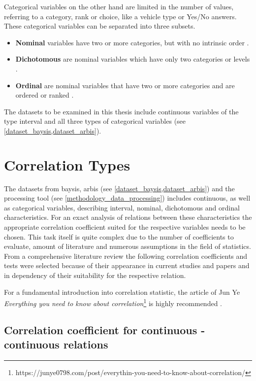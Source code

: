 Categorical variables on the other hand are limited in the number of values, referring to a category, rank or choice, like a vehicle type or Yes/No answers. These categorical variables can be separated into three subsets.

\begin{itemize}
	\item \textbf{Nominal} variables have two or more categories, but with no intrinsic order \parencite{Laerd2020}.
	\item \textbf{Dichotomous} are nominal variables which have only two categories or levels \parencite{Laerd2020}.
    \item \textbf{Ordinal} are nominal variables that have two or more categories and are ordered or ranked \parencite{Laerd2020}.
\end{itemize}

The datasets to be examined in this thesis include continuous variables of the type interval and all three types of categorical variables (see \cref{dataset_baysis,dataset_arbis}).

\section{Correlation Types}
\label{correlation_coefficient_types}
The datasets from \acrshort{baysis}, \acrshort{arbis} (see \cref{dataset_baysis,dataset_arbis}) and the processing tool (see \cref{methodology_data_processing}) includes continuous, as well as categorical variables, describing interval, nominal, dichotomous and ordinal characteristics. For an exact analysis of relations between these characteristics the appropriate correlation coefficient suited for the respective variables needs to be chosen. This task itself is quite complex due to the number of coefficients to evaluate, amount of literature and numerous assumptions in the field of statistics. From a comprehensive literature review the following correlation coefficients and tests were selected because of their appearance in current studies and papers and in dependency of their suitability for the respective relation.

For a fundamental introduction into correlation statistic, the article of Jun Ye \textit{Everything you need to know about correlation}\footnote{https://junye0798.com/post/everythin-you-need-to-know-about-correlation/} is highly recommended \parencite{Yun2020}.

\subsection{Correlation coefficient for continuous - continuous relations}
\label{correlation_pearson}

